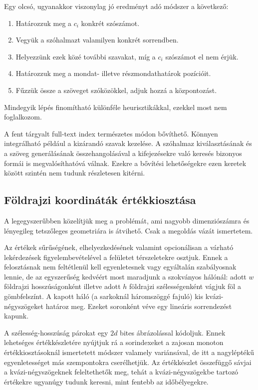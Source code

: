 \documentclass[
    parspace,
    noindent,
    nohyp,
]{elteiktdk}[2023/04/10]
\begin{document}
Egy olcsó, ugyanakkor viszonylag jó eredményt adó módszer a következő:

\begin{enumerate}
    \item Határozzuk meg a $c_i$ konkrét szószámot.
    \item Vegyük a szóhalmazt valamilyen konkrét sorrendben.
    \item Helyezzünk ezek közé további szavakat, míg a $c_i$ szószámot el nem érjük.
    \item Határozzuk meg a mondat- illetve részmondathatárok pozícióit.
    \item Fűzzük össze a szöveget szóközökkel, adjuk hozzá a központozást.
\end{enumerate}

Mindegyik lépés finomítható különféle heurisztikákkal,
ezekkel most nem foglalkozom.

A fent tárgyalt full-text index természetes módon bővíthető.
Könnyen integrálható például a kizárandó szavak kezelése.
A szóhalmaz kiválasztásának és a szöveg generálásának összehangolásával
a kifejezésekre való keresés bizonyos formái is megvalósíthatóvá válnak.
Ezekre a bővítési lehetőségekre ezen keretek között szintén nem tudunk részletesen kitérni.



\subsection{Földrajzi koordináták értékkiosztása}

A legegyszerűbben közelítjük meg a problémát,
ami nagyobb dimenziószámra és lényegileg tetszőleges geometriára is átvihető.
Csak a megoldás vázát ismertetem.

Az értékek sűrűségének, elhelyezkedésének valamint opcionálisan a várható lekérdezések
figyelembevételével a felületet térszeletekre osztjuk.
Ennek a felosztásnak nem feltétlenül kell egyenletesnek vagy egyáltalán szabályosnak lennie,
de az egyszerűség kedvéért most maradjunk a szokványos hálónál:
adott $w$ földrajzi hosszúságonként illetve adott $h$ földrajzi szélességenként vágjuk föl a gömbfelszínt.
A kapott háló (a sarkoknál háromszöggé fajuló) kis kvázi-négyszögeket határoz meg.
Ezeket soronként véve egy lineáris sorrendezést kapunk.

A szélesség-hosszúság párokat egy $2d$ bites ábrázolással kódoljuk.
Ennek lehetséges értékkészletére nyújtjuk rá a sorindexeket
a zajosan monoton értékkiosztásoknál ismertetett módszer valamely variánsával,
de itt a nagyléptékű egyenletességet más szempontokra cserélhetjük.
Az értékkészlet összefüggő sávjai a kvázi-négyszögeknek feleltethetők meg,
tehát a kvázi-négyszögekbe tartozó értékekre ugyanúgy tudunk keresni,
mint fentebb az időbélyegekre.
\end{document}
